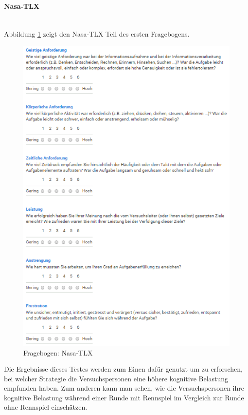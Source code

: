 \documentclass[12pt,a4paper]{scrartcl}
\begin{document}
\paragraph{Nasa-TLX}
~\\
Abbildung \ref{fbnasatlx} zeigt den Nasa-TLX Teil des ersten Fragebogens. 
\begin{figure}[htbp]
\begin{center}
\includegraphics[width=12cm]{nasa.png}
\caption{Fragebogen: Nasa-TLX}
\label{fbnasatlx}
\end{center}
\end{figure}
Die Ergebnisse dieses Testes werden zum Einen dafür genutzt um zu erforschen, bei welcher Strategie die Versuchspersonen eine höhere kognitive Belastung empfunden haben. Zum anderen kann man sehen, wie die Versuchspersonen ihre kognitive Belastung während einer Runde mit Rennspiel im Vergleich zur Runde ohne Rennspiel einschätzen. 
\end{document}
